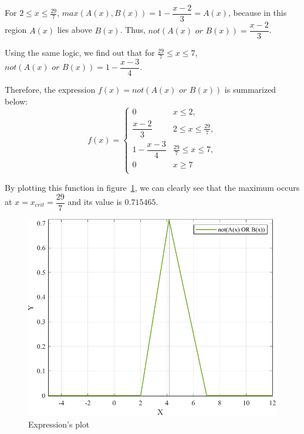 For $2 \le x \le \frac{29}{7}$, $\textit{max}\left(A(x), B(x)\right) = 1 - \dfrac{x-2}{3} = A(x)$, because in this region $A(x)$ lies above $B(x)$. Thus, $\textit{not}\left(A(x) \textit{ or } B(x)\right) = \dfrac{x-2}{3}$.

Using the same logic, we find out that for $\frac{29}{7} \le x \le 7$, $\textit{not}\left(A(x) \textit{ or } B(x)\right) = 1 - \dfrac{x-3}{4}$. 

Therefore, the expression $f(x) = \textit{not}\left(A(x) \textit{ or } B(x)\right)$ is summarized below:
\begin{equation}
	f(x) = \left\{
	\begin{array}{cc}
		0 & x \le 2, \\[4mm]
		\dfrac{x-2}{3} & 2 \le x \le \frac{29}{7}, \\[4mm]
		1 - \dfrac{x-3}{4} & \frac{29}{7} \le x \le 7, \\[4mm]
		0 & x \ge 7\\
	\end{array}
	\right.
\end{equation}

By plotting this function in figure~\ref{fig:prob_12_expression_plot}, we can clearly see that the maximum occurs at $x = x_{crit} = \dfrac{29}{7}$ and its value is $0.715465$.

\begin{figure}[htp]
	\centering
	\includegraphics[width=.45\textwidth]{../Problem 12/expression_plot.pdf}
	\caption{Expression's plot}
	\label{fig:prob_12_expression_plot}
\end{figure}
